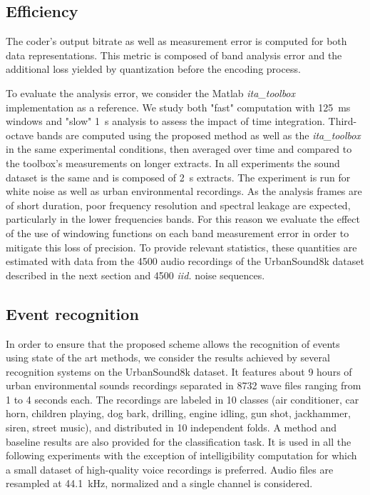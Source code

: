 \documentclass[sensors,article,submit,moreauthors,pdftex,10pt,a4paper]{mdpi}
\begin{document}
\subsection{Efficiency}

The coder's output bitrate as well as measurement error is computed for both data representations. This metric is composed of band analysis error and the additional loss yielded by quantization before the encoding process.


To evaluate the analysis error, we consider the Matlab \textit{ita\_toolbox} implementation \cite{itatoolbox2017} as a reference. We study both "fast" computation with 125~ms windows and "slow" 1~s analysis to assess the impact of time integration. Third-octave bands are computed using the proposed method as well as the \textit{ita\_toolbox} in the same experimental conditions, then averaged over time and compared to the toolbox's measurements on longer extracts. In all experiments the sound dataset is the same and is composed of 2~s extracts. The experiment is run for white noise as well as urban environmental recordings. As the analysis frames are of short duration, poor frequency resolution and spectral leakage are expected, particularly in the lower frequencies bands. For this reason we evaluate the effect of the use of windowing functions on each band measurement error in order to mitigate this loss of precision. To provide relevant statistics, these quantities are estimated with data from the 4500 audio recordings of the UrbanSound8k dataset \cite{salamon2014} described in the next section and 4500 \textit{iid.} noise sequences.

\subsection{Event recognition}

In order to ensure that the proposed scheme allows the recognition of events using state of the art methods, we consider the results achieved by several recognition systems on the UrbanSound8k dataset\cite{salamon2014}. It features about 9 hours of urban environmental sounds recordings separated in 8732 wave files ranging from 1 to 4 seconds each. The recordings are labeled in 10 classes (air conditioner, car horn, children playing, dog bark, drilling, engine idling, gun shot, jackhammer, siren, street music), and distributed in 10 independent folds. A method and baseline results are also provided for the classification task. It is used in all the following experiments with the exception of intelligibility computation for which a small dataset of high-quality voice recordings is preferred. Audio files are resampled at 44.1~kHz, normalized and a single channel is considered.
\end{document}
